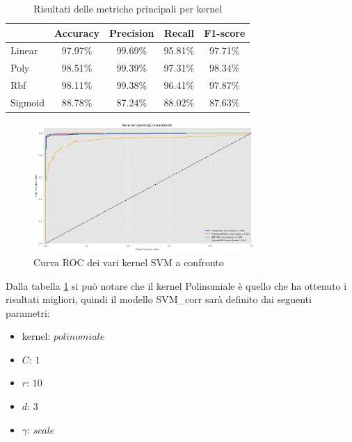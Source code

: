 \begin{table}[!ht]
    \centering
    \begin{tabular}{@{}lcccc@{}}
        \toprule
        \rowcolor[HTML]{EFEFEF}
        \multicolumn{1}{c}{\cellcolor[HTML]{EFEFEF}\textbf{kernel}} & \textbf{Accuracy} & \textbf{Precision} & \textbf{Recall} & \textbf{F1-score} \\ \midrule
        Linear                                                      & 97.97\%           & 99.69\%            & 95.81\%         & 97.71\%           \\
        Poly                                                        & 98.51\%           & 99.39\%            & 97.31\%         & 98.34\%           \\
        Rbf                                                         & 98.11\%           & 99.38\%            & 96.41\%         & 97.87\%           \\
        Sigmoid                                                     & 88.78\%           & 87.24\%            & 88.02\%         & 87.63\%           \\ \bottomrule
    \end{tabular}
    \caption{Risultati delle metriche principali per kernel}
    \label{tab:top_metrics_kernels_corr}
\end{table}
\begin{figure}[!ht]
    \centering
    \includegraphics[width=0.75\textwidth]{img/svm/roc_SVM.png}
    \caption{Curva ROC dei vari kernel SVM a confronto}
    \label{fig:roc_SVM_corr}
\end{figure}

Dalla tabella \ref{tab:top_metrics_kernels_corr} si può notare che il kernel Polinomiale
è quello che ha ottenuto i risultati migliori, quindi il modello SVM\_corr sarà
definito dai seguenti parametri:
\begin{itemize}
    \item kernel: $polinomiale$
    \item $C$: $1$
    \item $r$: $10$
    \item $d$: $3$
    \item $\gamma$: $scale$
\end{itemize}

